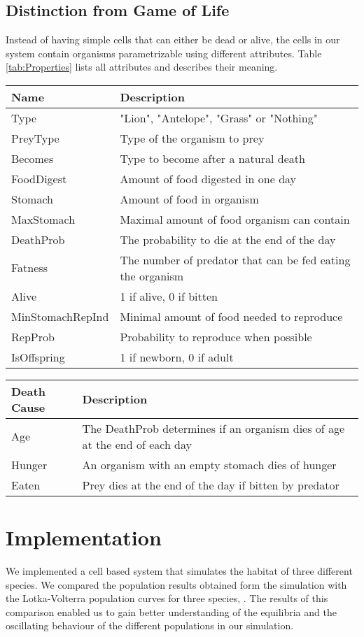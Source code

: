 \documentclass[11pt]{article}
\begin{document}
\subsection{Distinction from Game of Life}
Instead of having simple cells that can either be dead or alive, the cells in our system contain organisms parametrizable using different attributes. Table \ref{tab:Properties} lists all attributes and describes their meaning.

\begin{tabular}{l|l}\label{tab:Properties}
Name & Description\\
\hline 
\hline 
Type & "Lion", "Antelope", "Grass" or "Nothing" \\ 
\hline 
PreyType & Type of the organism to prey \\ 
\hline 
Becomes & Type to become after a natural death \\ 
\hline 
FoodDigest & Amount of food digested in one day \\ 
\hline 
Stomach & Amount of food in organism \\ 
\hline 
MaxStomach & Maximal amount of food organism can contain \\ 
\hline 
DeathProb & The probability to die at the end of the day \\ 
\hline 
Fatness & The number of predator that can be fed eating the organism \\ 
\hline
Alive & 1 if alive, 0 if bitten\\
\hline 
MinStomachRepInd & Minimal amount of food needed to reproduce \\  
\hline 
RepProb & Probability to reproduce when possible\\
\hline 
IsOffspring & 1 if newborn, 0 if adult\\
\end{tabular}

\begin{tabular}{l|l}\label{tab:deathCauses}
Death Cause & Description \\ 
\hline 
\hline 
Age & The DeathProb determines if an organism dies of age at the end of each day\\ 
\hline 
Hunger & An organism with an empty stomach dies of hunger \\ 
\hline 
Eaten & Prey dies at the end of the day if bitten by predator \\  
\end{tabular} 

\section{Implementation}
We implemented a cell based system that simulates the habitat of three different species.
We compared the population results obtained form the simulation with the Lotka-Volterra population curves for three species, \cite{lotkaVolterraThreeSpecies}. The results of this comparison enabled us to gain better understanding of the equilibria and the oscillating behaviour of the different populations in our simulation.
\end{document}
